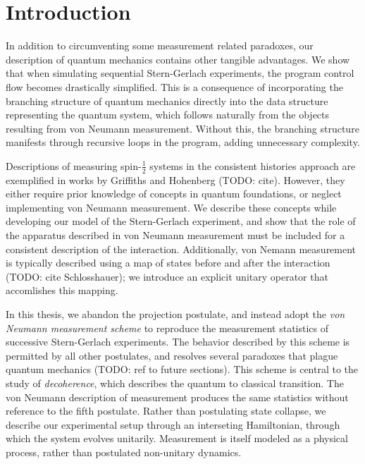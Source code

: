 \chapter{Introduction}



In addition to circumventing some measurement related paradoxes, our description of quantum mechanics contains other tangible advantages. We show that when simulating sequential Stern-Gerlach experiments, the program control flow becomes drastically simplified. This is a consequence of incorporating the branching structure of quantum mechanics directly into the data structure representing the quantum system, which follows naturally from the objects resulting from von Neumann measurement. Without this, the branching structure manifests through recursive loops in the program, adding unnecessary complexity.

Descriptions of measuring spin-$\frac{1}{2}$ systems in the consistent histories approach are exemplified in works by Griffiths and Hohenberg (TODO: cite). However, they either require prior knowledge of concepts in quantum foundations, or neglect implementing von Neumann measurement. We describe these concepts while developing our model of the Stern-Gerlach experiment, and show that the role of the apparatus described in von Neumann measurement must be included for a consistent description of the interaction. Additionally, von Nemann measurement is typically described using a map of states before and after the interaction (TODO: cite Schlosshauer); we introduce an explicit unitary operator that accomlishes this mapping.

In this thesis, we abandon the projection postulate, and instead adopt the \textit{von Neumann measurement scheme} to reproduce the measurement statistics of successive Stern-Gerlach experiments. The behavior described by this scheme is permitted by all other postulates, and resolves several paradoxes that plague quantum mechanics (TODO: ref to future sections). This scheme is central to the study of \textit{decoherence}, which describes the quantum to classical transition. The von Neumann description of measurement produces the same statistics without reference to the fifth postulate. Rather than postulating state collapse, we describe our experimental setup through an interseting Hamiltonian, through which the system evolves unitarily. Measurement is itself modeled as a physical process, rather than  postulated non-unitary dynamics.

